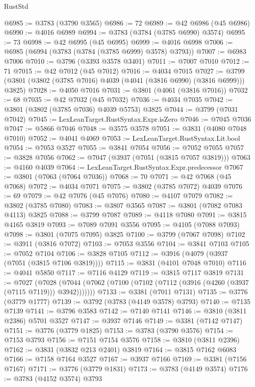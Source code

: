 \begin{lexlean}{RustStd}
\begin{coremodule}
@6985 := @3783 (@3790 @3565)
@6986 := 72
@6989 := @42 @6986 (@45 @6986)
@6990 := @4016 @6989
@6994 := @3783 (@3784 (@3785 @6990) @3574)
@6995 := 73
@6998 := @42 @6995 (@45 @6995)
@6999 := @4016 @6998
@7006 := @6985 (@6994 (@3783 (@3784 (@3785 @6999) @3578) @3793))
@7007 := @6983 @7006
@7010 := @3796 (@3393 @3578 @3401)
@7011 := @7007 @7010
@7012 := 71
@7015 := @42 @7012 (@45 @7012)
@7016 := @4034 @7015
@7027 := @3799 (@3801 (@3802 (@3785 @7016) @4039 (@4041 (@3816 @6990) (@3816 @6999))) @3825)
@7028 := @4050 @7016
@7031 := @3801 (@4061 (@3816 @7016))
@7032 := 68
@7035 := @42 @7032 (@45 @7032)
@7036 := @4034 @7035
@7042 := @3801 (@3802 (@3785 @7036) @4039 @5753) @3825
@7044 := @3799 (@7031 @7042)
@7045 := LexLeanTarget.RustSyntax.Expr.isZero
@7046 := @7045 @7036
@7047 := @5866 @7046
@7048 := @3575 @3578
@7051 := @3831 (@4080 @7048 @7010)
@7052 := @4041 @4069
@7053 := LexLeanTarget.RustSyntax.Lit.bool
@7054 := @7053 @3527
@7055 := @3841 @7054
@7056 := @7052 @7055
@7057 := @3828 @7056
@7062 := @7047 (@3937 (@7051 (@3815 @7057 @3819)))
@7063 := @4160 @4039
@7064 := LexLeanTarget.RustSyntax.Expr.predecessor
@7067 := @3801 (@7063 (@7064 @7036))
@7068 := 70
@7071 := @42 @7068 (@45 @7068)
@7072 := @4034 @7071
@7075 := @3802 (@3785 @7072) @4039
@7076 := 69
@7079 := @42 @7076 (@45 @7076)
@7080 := @4107 @7079
@7082 := @3802 (@3785 @7080)
@7083 := @3807 @3565
@7087 := @3801 (@7082 @7083 @4113) @3825
@7088 := @3799 @7087
@7089 := @4118 @7080
@7091 := @3815 @4165 @3819
@7093 := @7089 @7091 @3556
@7095 := @4105 (@7088 @7093)
@7098 := @3801 (@7075 @7095) @3825
@7100 := @3799 (@7067 @7098)
@7102 := @3911 (@3816 @7072)
@7103 := @7053 @3556
@7104 := @3841 @7103
@7105 := @7052 @7104
@7106 := @3828 @7105
@7112 := @3916 (@4079 (@3937 (@7051 (@3815 @7106 @3819))))
@7115 := @3831 (@4101 @7048 @7010)
@7116 := @4041 @5850
@7117 := @7116 @4129
@7119 := @3815 @7117 @3819
@7131 := @7027
    (@7028 (@7044 (@7062 (@7100 (@7102 (@7112 (@3916 (@4260 (@3937 (@7115 @7119))) @3942)))))))
@7133 := @3381 (@7011 @7131)
@7135 := @3776 (@3779 @1777)
@7139 := @3792 (@3783 (@4149 @3578) @3793)
@7140 := @7135 @7139
@7141 := @3796 @3583
@7142 := @7140 @7141
@7146 := @3810 (@3811 @2386) @5701 @3527
@7147 := @3937 @7146
@7149 := @3381 (@7142 @7147)
@7151 := @3776 (@3779 @1825)
@7153 := @3783 (@3790 @3576)
@7154 := @7153 @3793
@7156 := @7151 @7154 @3576
@7158 := @3810 (@3811 @2396)
@7162 := @3831 (@3832 @213 @2401) @3819
@7164 := @3815 @7162 @6083
@7166 := @7158 @7164 @3527
@7167 := @3937 @7166
@7169 := @3381 (@7156 @7167)
@7171 := @3776 (@3779 @1831)
@7173 := @3783 (@4149 @3574)
@7176 := @3783 (@4152 @3574) @3793

\end{coremodule}
\end{lexlean}
